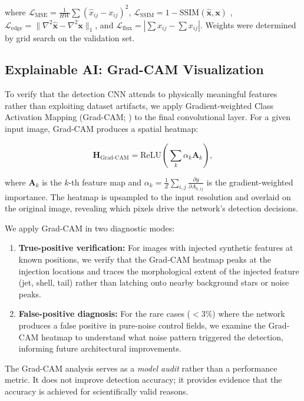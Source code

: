 \documentclass[usenatbib]{mnras}
\begin{document}
where $\mathcal{L}_{\text{MSE}} = \frac{1}{HW}\sum(\hat{x}_{ij} - x_{ij})^2$, $\mathcal{L}_{\text{SSIM}} = 1 - \text{SSIM}(\hat{\mathbf{x}}, \mathbf{x})$ \citep{wang04}, $\mathcal{L}_{\text{edge}} = \|\nabla^2\hat{\mathbf{x}} - \nabla^2\mathbf{x}\|_1$, and $\mathcal{L}_{\text{flux}} = |\sum\hat{x}_{ij} - \sum x_{ij}|$. Weights were determined by grid search on the validation set.

\subsection{Explainable AI: Grad-CAM Visualization}\label{sec:xai}

To verify that the detection CNN attends to physically meaningful features rather than exploiting dataset artifacts, we apply Gradient-weighted Class Activation Mapping (Grad-CAM; \citealt{selvaraju17}) to the final convolutional layer. For a given input image, Grad-CAM produces a spatial heatmap:

\begin{equation}\label{eq:gradcam}
\mathbf{H}_{\text{Grad-CAM}} = \text{ReLU}\left(\sum_k \alpha_k \mathbf{A}_k\right),
\end{equation}

where $\mathbf{A}_k$ is the $k$-th feature map and $\alpha_k = \frac{1}{Z}\sum_{i,j}\frac{\partial y}{\partial A_{k,ij}}$ is the gradient-weighted importance. The heatmap is upsampled to the input resolution and overlaid on the original image, revealing which pixels drive the network's detection decisions.

We apply Grad-CAM in two diagnostic modes:

\begin{enumerate}
    \item \textbf{True-positive verification:} For images with injected synthetic features at known positions, we verify that the Grad-CAM heatmap peaks at the injection locations and traces the morphological extent of the injected feature (jet, shell, tail) rather than latching onto nearby background stars or noise peaks.
    \item \textbf{False-positive diagnosis:} For the rare cases ($<3\%$) where the network produces a false positive in pure-noise control fields, we examine the Grad-CAM heatmap to understand what noise pattern triggered the detection, informing future architectural improvements.
\end{enumerate}

The Grad-CAM analysis serves as a \textit{model audit} rather than a performance metric. It does not improve detection accuracy; it provides evidence that the accuracy is achieved for scientifically valid reasons.
\end{document}
